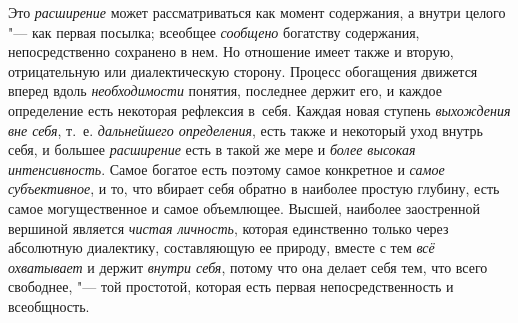 Это {\em расширение} может рассматриваться как момент содержания, а внутри
целого "--- как первая посылка; всеобщее {\em сообщено} богатству
содержания, непосредственно сохранено в нем. Но отношение имеет также и
вторую, отрицательную или диалектическую сторону. Процесс обогащения
движется вперед вдоль {\em необходимости}
понятия, последнее держит его, и каждое определение есть
некоторая рефлексия в~себя. Каждая новая ступень
{\em выхождения вне себя}, т.~е. {\em дальнейшего
определения}, есть также и некоторый уход внутрь себя, и
большее {\em расширение} есть в такой же мере и
{\em более высокая интенсивность}.
Самое богатое есть поэтому самое конкретное и {\em самое субъективное},
и то, что вбирает себя обратно в наиболее простую глубину,
есть самое могущественное и самое объемлющее. Высшей, наиболее заостренной
вершиной является {\em чистая
личность}, которая единственно только через абсолютную
диалектику, составляющую ее природу, вместе с тем
{\em всё охватывает} и держит {\em внутри себя},
потому что она делает себя тем, что всего свободнее, "---
той простотой, которая есть первая непосредственность и всеобщность.

